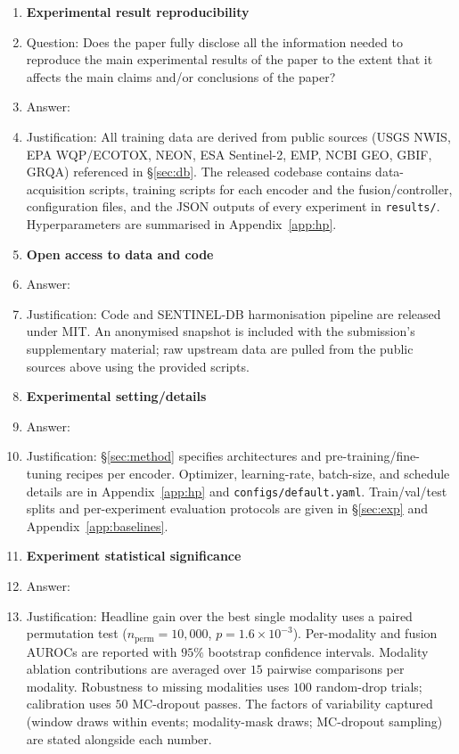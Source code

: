 \begin{enumerate}
\item {\bf Experimental result reproducibility}
    \item[] Question: Does the paper fully disclose all the information needed to reproduce the main experimental results of the paper to the extent that it affects the main claims and/or conclusions of the paper?
    \item[] Answer: \answerYes{}
    \item[] Justification: All training data are derived from public sources (USGS NWIS, EPA WQP/ECOTOX, NEON, ESA Sentinel-2, EMP, NCBI GEO, GBIF, GRQA) referenced in \S\ref{sec:db}. The released codebase contains data-acquisition scripts, training scripts for each encoder and the fusion/controller, configuration files, and the JSON outputs of every experiment in \texttt{results/}. Hyperparameters are summarised in Appendix~\ref{app:hp}.

\item {\bf Open access to data and code}
    \item[] Answer: \answerYes{}
    \item[] Justification: Code and SENTINEL-DB harmonisation pipeline are released under MIT. An anonymised snapshot is included with the submission's supplementary material; raw upstream data are pulled from the public sources above using the provided scripts.

\item {\bf Experimental setting/details}
    \item[] Answer: \answerYes{}
    \item[] Justification: \S\ref{sec:method} specifies architectures and pre-training/fine-tuning recipes per encoder. Optimizer, learning-rate, batch-size, and schedule details are in Appendix~\ref{app:hp} and \texttt{configs/default.yaml}. Train/val/test splits and per-experiment evaluation protocols are given in \S\ref{sec:exp} and Appendix~\ref{app:baselines}.

\item {\bf Experiment statistical significance}
    \item[] Answer: \answerYes{}
    \item[] Justification: Headline gain over the best single modality uses a paired permutation test ($n_\text{perm}\!=\!10{,}000$, $p\!=\!1.6{\times}10^{-3}$). Per-modality and fusion AUROCs are reported with $95\%$ bootstrap confidence intervals. Modality ablation contributions are averaged over $15$ pairwise comparisons per modality. Robustness to missing modalities uses $100$ random-drop trials; calibration uses $50$ MC-dropout passes. The factors of variability captured (window draws within events; modality-mask draws; MC-dropout sampling) are stated alongside each number.


\end{enumerate}
